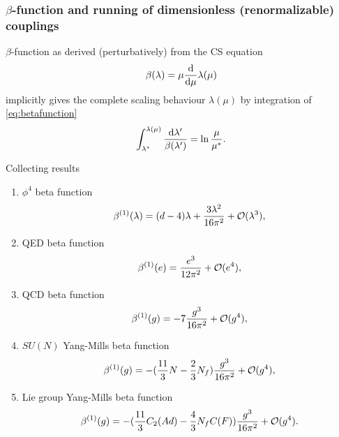 \subsubsection{$\beta$-function and running of dimensionless (renormalizable) couplings}
\label{subsubsec:betafunc}
\begin{mybox}{}
	$\beta$-function as derived (perturbatively) from the CS equation
	\begin{equation}
	\label{eq:betafunction}
		\beta(\lambda) = \mu \frac{\mathrm{d}}{\mathrm{d} \mu} \lambda(\mu)
	\end{equation}
	implicitly gives the complete scaling behaviour $\lambda(\mu)$ by integration of \ref{eq:betafunction}
	\begin{equation}
		\int_{\lambda^*}^{\lambda(\mu)} \frac{\mathrm{d} \lambda^\prime}{\beta(\lambda^\prime)} = \ln \frac{\mu}{\mu^*}.
	\end{equation}
\end{mybox}
Collecting results
\begin{enumerate}
	\item $\phi^4$ beta function
	\begin{equation}
		\beta^{(1)}(\lambda) = (d-4) \lambda + \frac{3 \lambda^2}{16 \pi^2} + \mathcal{O}(\lambda^3),
	\end{equation}
	\item QED beta function
	\begin{equation}
		\beta^{(1)}(e) = \frac{e^3}{12 \pi^2} + \mathcal{O}(e^4),
	\end{equation}
	\item QCD beta function
	\begin{equation}
		\beta^{(1)}(g) = -7 \frac{g^3}{16 \pi^2}+\mathcal{O}(g^4),
	\end{equation}
	\item $SU(N)$ Yang-Mills beta function
	\begin{equation}
		\beta^{(1)}(g) = - (\frac{11}{3} N - \frac{2}{3} N_f) \frac{g^3}{16 \pi^2} + \mathcal{O}(g^4),
	\end{equation}
	\item Lie group Yang-Mills beta function
	\begin{equation}
		\beta^{(1)}(g) = - (\frac{11}{3} C_2(Ad) - \frac{4}{3} N_f C(F)) \frac{g^3}{16 \pi^2} + \mathcal{O}(g^4).
	\end{equation}
\end{enumerate}
